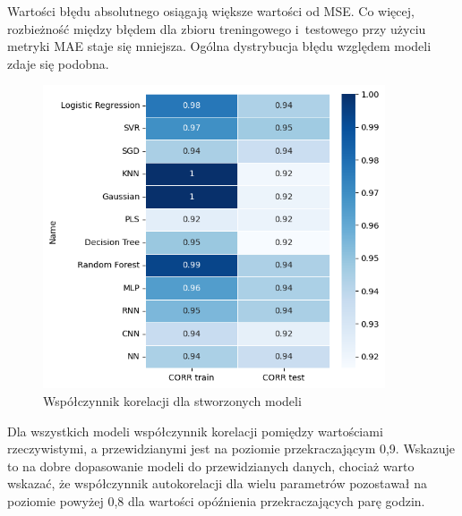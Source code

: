 Wartości błędu absolutnego osiągają większe wartości od MSE. Co więcej,
rozbieżność między błędem dla zbioru treningowego i~testowego
przy użyciu metryki MAE staje się mniejsza. Ogólna dystrybucja błędu 
względem modeli zdaje się podobna.

\begin{figure}[H]
    \centering
    \includegraphics[width=0.9\textwidth]{images/corr.png}
    \caption[Współczynnik korelacji]{Współczynnik korelacji dla stworzonych modeli}
    \label{corr}
\end{figure}

Dla wszystkich modeli współczynnik korelacji pomiędzy wartościami rzeczywistymi, 
a przewidzianymi jest na poziomie przekraczającym 0,9. Wskazuje to na dobre dopasowanie
modeli do przewidzianych danych, chociaż warto wskazać, że współczynnik
autokorelacji dla wielu parametrów pozostawał na poziomie powyżej 0,8 dla wartości
opóźnienia przekraczających parę godzin.

